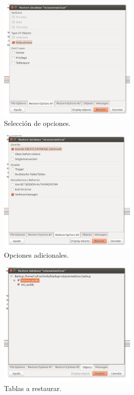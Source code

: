 \begin{figure}[h]
  \centering
    \includegraphics[width=0.6\textwidth]{../img/restoredb/tres.jpg}
  \caption{Selección de opciones.}
  \label{tres}
\end{figure}

\begin{figure}[h]
  \centering
    \includegraphics[width=0.6\textwidth]{../img/restoredb/cuatro.jpg}
  \caption{Opciones adicionales.}
  \label{cuatro}
\end{figure}

\begin{figure}[h]
  \centering
    \includegraphics[width=0.6\textwidth]{../img/restoredb/cinco.jpg}
  \caption{Tablas a restaurar.}
  \label{cinco}
\end{figure}


